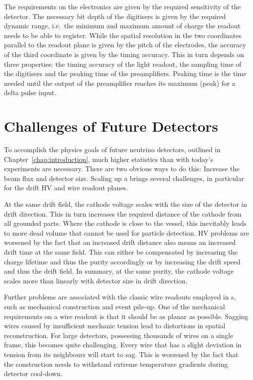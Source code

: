 The requirements on the electronics are given by the required sensitivity of the detector.
The necessary bit depth of the digitisers is given by the required dynamic range, i.e.\ the minimum and maximum amount of charge the readout needs to be able to register.
While the spatial resolution in the two coordinates parallel to the readout plane is given by the pitch of the electrodes, the accuracy of the third coordinate is given by the timing accuracy.
This in turn depends on three properties: the timing accuracy of the light readout, the sampling time of the digitisers and the peaking time of the preamplifiers.
Peaking time is the time needed until the output of the preamplifier reaches its maximum (peak) for a delta pulse input.

\afterpage{\clearpage}


\section{Challenges of Future Detectors}
\label{sec:lartpc_challenges}

To accomplish the physics goals of future neutrino detectors, outlined in Chapter~\ref{chap:introduction}, much higher statistics than with today's experiments are necessary.
There are two obvious ways to do this: Increase the beam flux and detector size.
Scaling up a \lartpc{} brings several challenges, in particular for the drift HV and wire readout planes.

At the same drift field, the cathode voltage scales with the size of the detector in drift direction.
This in turn increases the required distance of the cathode from all grounded parts.
Where the cathode is close to the \lar{} vessel, this inevitably leads to more dead volume that cannot be used for particle detection.
HV problems are worsened by the fact that an increased drift distance also means an increased drift time at the same field.
This can either be compensated by increasing the charge lifetime and thus the \lar{} purity accordingly or by increasing the drift speed and thus the drift field.
In summary, at the same \lar{} purity, the cathode voltage scales more than linearly with detector size in drift direction.

Further problems are associated with the classic wire readouts employed in \lartpc{}s, such as mechanical construction and event pile-up.
One of the mechanical requirements on a wire readout is that it should be as planar as possible.
Sagging wires caused by insufficient mechanic tension lead to distortions in spatial reconstruction.
For large detectors, possessing thousands of wires on a single frame, this becomes quite challenging.
Every wire that has a slight deviation in tension from its neighbours will start to sag.
This is worsened by the fact that the construction needs to withstand extreme temperature gradients during detector cool-down.

